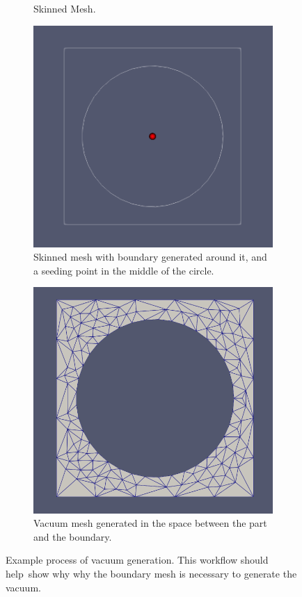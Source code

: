 \documentclass[12pt, letterpaper]{article}
\begin{document}
\begin{figure}
\begin{subfigure}{0.4\textwidth}
	    \caption{Skinned Mesh.}
	\end{subfigure}
	\vspace*{\fill}	
	\begin{subfigure}{0.4\textwidth}
	    \includegraphics[width=\linewidth]{	processExample/bound.png}
	    \caption{Skinned mesh with boundary generated around it, and a seeding point in the middle of the circle.}
	    \label{SeedingPoint}
	\end{subfigure}
	\hspace*{\fill}	
	\begin{subfigure}{0.4\textwidth}
	    \includegraphics[width=\linewidth]{	processExample/vac.png}
	    \caption{Vacuum mesh generated in the space between the part and the boundary.}
	\end{subfigure}
	\caption{Example process of vacuum generation. This workflow should help\
	show why why the boundary mesh is necessary to generate the vacuum.}
	\label{Boundary Example}
\end{figure}
\end{document}
